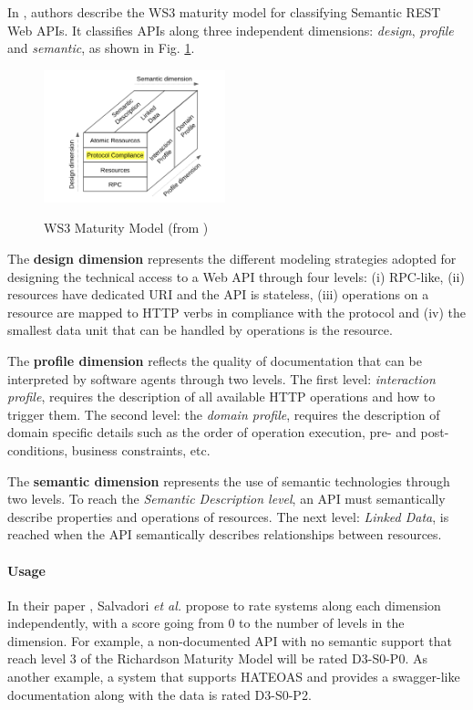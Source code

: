 In \cite{7195633}, authors describe the WS3 maturity model for classifying Semantic REST Web APIs. 
It classifies APIs along three independent dimensions: \textit{design}, \textit{profile} and \textit{semantic}, as shown in Fig. \ref{WS3}.

\begin{figure}[ht]
  \caption{\vspace*{-0.5cm} WS3 Maturity Model (from \cite{7195633})}
  \centering
  \includegraphics[width=0.47\textwidth]{figures/ws3-maturity-model.png}
  \label{WS3}
\end{figure}

The \textbf{design dimension} represents the different modeling strategies adopted for designing the technical access to a Web API through four levels:
(i) RPC-like, (ii) resources have dedicated URI and the API is stateless, (iii) operations on a resource are mapped to HTTP verbs in compliance with the protocol and (iv) the smallest data unit that can be handled by operations is the resource.

The \textbf{profile dimension} reflects the quality of documentation that can be interpreted by software agents through two levels. The first level: \textit{interaction profile}, requires the description of all available HTTP operations and how to trigger them. The second level: the \textit{domain profile}, requires the description of domain specific details such as the order of operation execution, pre- and post-conditions, business constraints, etc.

The \textbf{semantic dimension} represents the use of semantic technologies through two levels. To reach the \textit{Semantic Description level}, an API must semantically describe properties and operations of resources. The next level: \textit{Linked Data}, is reached when the API semantically describes relationships between resources.

\paragraph{Usage}
In their paper \cite{7195633}, Salvadori \emph{et al.} propose to rate systems along each dimension independently, with a score going from 0 to the number of levels in the dimension.
For example, a non-documented API with no semantic support that reach level 3 of the Richardson Maturity Model will be rated D3-S0-P0. As another example, a system that supports HATEOAS and provides a swagger-like documentation along with the data is rated D3-S0-P2.

